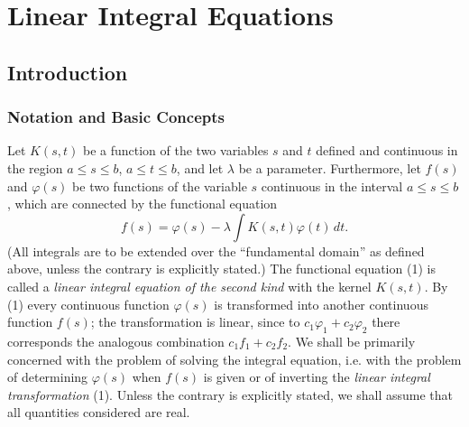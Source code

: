 \chapter{Linear Integral Equations}

\section{Introduction}

\subsection{Notation and Basic Concepts}
Let $K(s,t)$ be a function of the two variables $s$ and $t$ defined and continuous in the region $a\le s\le b$, $a\le t\le b$, and let $\lambda$ be a parameter. Furthermore, let $f(s)$ and $\varphi(s)$ be two functions of the variable $s$ continuous in the interval $a\le s\le b$, which are connected by the functional equation
\begin{equation}\tag{1}
f(s)=\varphi(s)-\lambda\int K(s,t)\varphi(t)\,dt.
\end{equation}
(All integrals are to be extended over the ``fundamental domain'' as defined above, unless the contrary is explicitly stated.) The functional equation (1) is called a \emph{linear integral equation of the second kind} with the kernel $K(s,t)$. By (1) every continuous function $\varphi(s)$ is transformed into another continuous function $f(s)$; the transformation is linear, since to $c_1\varphi_1+c_2\varphi_2$ there corresponds the analogous combination $c_1f_1+c_2f_2$. We shall be primarily concerned with the problem of solving the integral equation, i.e. with the problem of determining $\varphi(s)$ when $f(s)$ is given or of inverting the \emph{linear integral transformation} (1). Unless the contrary is explicitly stated, we shall assume that all quantities considered are real.

